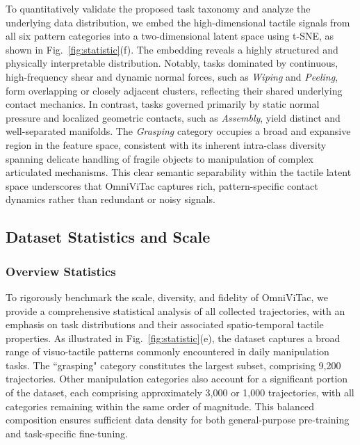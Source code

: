 To quantitatively validate the proposed task taxonomy and analyze the underlying data distribution, we embed the high-dimensional tactile signals from all six pattern categories into a two-dimensional latent space using t-SNE, as shown in Fig.~\ref{fig:statistic}(f). The embedding reveals a highly structured and physically interpretable distribution. Notably, tasks dominated by continuous, high-frequency shear and dynamic normal forces, such as \textit{Wiping} and \textit{Peeling}, form overlapping or closely adjacent clusters, reflecting their shared underlying contact mechanics. In contrast, tasks governed primarily by static normal pressure and localized geometric contacts, such as \textit{Assembly}, yield distinct and well-separated manifolds. The \textit{Grasping} category occupies a broad and expansive region in the feature space, consistent with its inherent intra-class diversity spanning delicate handling of fragile objects to manipulation of complex articulated mechanisms. This clear semantic separability within the tactile latent space underscores that OmniViTac captures rich, pattern-specific contact dynamics rather than redundant or noisy signals.



\subsection{Dataset Statistics and Scale}
\label{sec:statistics}

\subsubsection{Overview Statistics}
To rigorously benchmark the scale, diversity, and fidelity of OmniViTac, we provide a comprehensive statistical analysis of all collected trajectories, with an emphasis on task distributions and their associated spatio-temporal tactile properties.
As illustrated in Fig.~\ref{fig:statistic}(e), the dataset captures a broad range of visuo-tactile patterns commonly encountered in daily manipulation tasks. The ``grasping" category constitutes the largest subset, comprising 9,200 trajectories. Other manipulation categories also account for a significant portion of the dataset, each comprising approximately 3,000 or 1,000 trajectories, with all categories remaining within the same order of magnitude. This balanced composition ensures sufficient data density for both general-purpose pre-training and task-specific fine-tuning.





